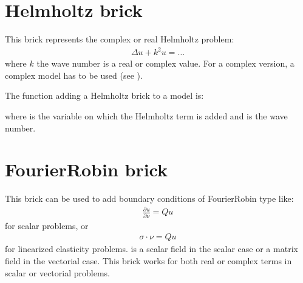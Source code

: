\documentclass[a4paper,11pt,english]{sphinxmanual}
\begin{document}
\section{Helmholtz brick}
\label{\detokenize{userdoc/model_helmholtz:helmholtz-brick}}\label{\detokenize{userdoc/model_helmholtz:ud-model-helmholtz}}\label{\detokenize{userdoc/model_helmholtz:index-0}}\label{\detokenize{userdoc/model_helmholtz::doc}}
This brick represents the complex or real Helmholtz problem:
\begin{equation*}
\begin{split}\Delta u + k^2 u = \ldots\end{split}
\end{equation*}
where \(k\) the wave number is a real or complex value. For a complex
version, a complex model has to be used (see ).

The function adding a Helmholtz brick to a model is:

\begin{sphinxVerbatim}[commandchars=\\\{\}]
    
\end{sphinxVerbatim}

where  is the variable on which the Helmholtz term is added and
 is the wave number.

\ignorespaces 

\section{Fourier\sphinxhyphen{}Robin brick}
\label{\detokenize{userdoc/model_fourier_robin:fourier-robin-brick}}\label{\detokenize{userdoc/model_fourier_robin:ud-model-fourier-robin}}\label{\detokenize{userdoc/model_fourier_robin:index-0}}\label{\detokenize{userdoc/model_fourier_robin::doc}}
This brick can be used to add boundary conditions of Fourier\sphinxhyphen{}Robin type like:
\begin{equation*}
\begin{split}\frac{\partial u}{\partial \nu} = Qu\end{split}
\end{equation*}
for scalar problems, or
\begin{equation*}
\begin{split}\sigma\cdot \nu = Qu\end{split}
\end{equation*}
for linearized elasticity problems.  is a scalar field in the scalar case or
a matrix field in the vectorial case. This brick works for both real or complex
terms in scalar or vectorial problems.
\end{document}
